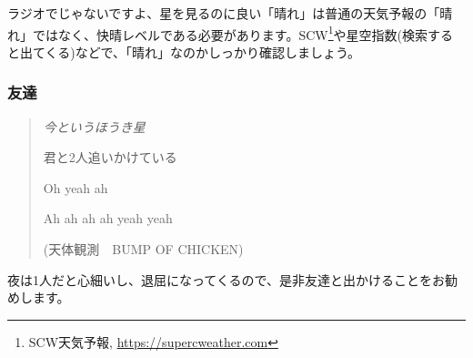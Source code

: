 \documentclass[../main]{subfiles}
\begin{document}
ラジオでじゃないですよ、星を見るのに良い「晴れ」は普通の天気予報の「晴れ」ではなく、快晴レベルである必要があります。SCW\footnote{SCW天気予報, \url{https://supercweather.com}}や星空指数(検索すると出てくる)などで、「晴れ」なのかしっかり確認しましょう。


\subsubsection{友達}
\begin{verse}
  {\slshape
  今というほうき星

  君と2人追いかけている

  Oh yeah ah

  Ah ah ah ah yeah yeah

  }
  (天体観測　BUMP OF CHICKEN)
\end{verse}

夜は1人だと心細いし、退屈になってくるので、是非友達と出かけることをお勧めします。
\end{document}
